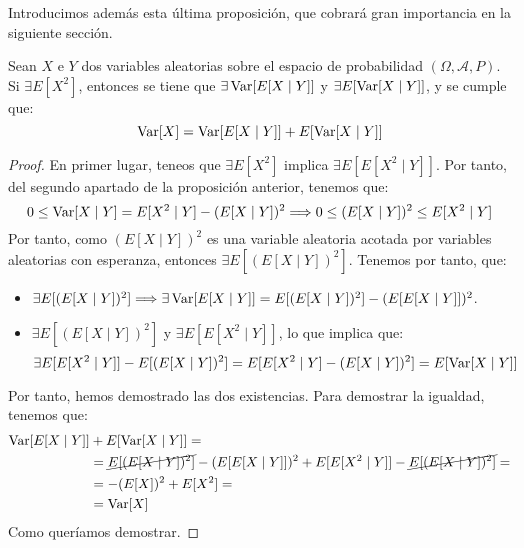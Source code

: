 Introducimos además esta última proposición, que cobrará gran importancia en la siguiente sección.
\begin{prop}
    Sean $X$ e $Y$ dos variables aleatorias sobre el espacio de probabilidad $(\Omega, \mathcal{A}, P)$. Si $\exists E[X^2]$, entonces se tiene que $\exists \operatorname{Var}[E[X\mid Y]]$ y $\exists E[\operatorname{Var}[X\mid Y]]$, y se cumple que:
    \begin{equation*}
        \operatorname{Var}[X] = \operatorname{Var}[E[X\mid Y]] + E[\operatorname{Var}[X\mid Y]]
    \end{equation*}
\end{prop}
\begin{proof}
    En primer lugar, teneos que $\exists E[X^2]$ implica $\exists E[E[X^2\mid Y]]$. Por tanto, del segundo apartado de la proposición anterior, tenemos que:
    \begin{equation*}
        0\leq \operatorname{Var}[X\mid Y] = E[X^2\mid Y] - (E[X\mid Y])^2
        \Longrightarrow 0\leq (E[X\mid Y])^2 \leq E[X^2\mid Y]
    \end{equation*}
    Por tanto, como $(E[X\mid Y])^2$ es una variable aleatoria acotada por variables aleatorias con esperanza, entonces $\exists E[(E[X\mid Y])^2]$. Tenemos por tanto, que:
    \begin{itemize}
        \item $\exists E[(E[X\mid Y])^2]\Longrightarrow \exists \operatorname{Var}[E[X\mid Y]] = E[(E[X\mid Y])^2] - (E[E[X\mid Y]])^2$.
        \item $\exists E[(E[X\mid Y])^2]$ y $\exists E[E[X^2\mid Y]]$, lo que implica que:
        \begin{equation*}
            \exists E[E[X^2\mid Y]] - E[(E[X\mid Y])^2] = E[E[X^2\mid Y] - (E[X\mid Y])^2] = E[\operatorname{Var}[X\mid Y]]
        \end{equation*}
    \end{itemize}

    Por tanto, hemos demostrado las dos existencias. Para demostrar la igualdad, tenemos que:
    \begin{align*}
        \operatorname{Var}[E[X\mid Y]] &+ E[\operatorname{Var}[X\mid Y]]
        =\\&= \cancel{E[(E[X\mid Y])^2]} - (E[E[X\mid Y]])^2 + E[E[X^2\mid Y]]-\cancel{E[(E[X\mid Y])^2] }
        =\\&= - (E[X])^2 + E[X^2] =\\&= \operatorname{Var}[X]
    \end{align*}
    Como queríamos demostrar.
\end{proof}

